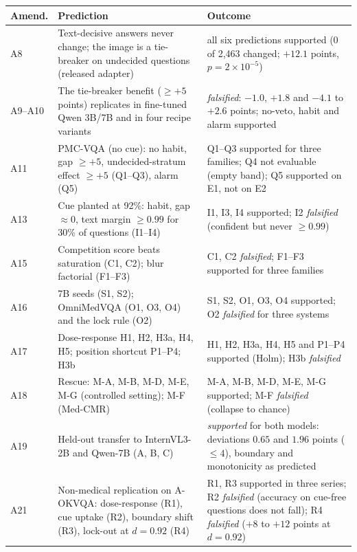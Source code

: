 \begin{table}[t]
  \centering
  \footnotesize
  \setlength{\tabcolsep}{4pt}
  \begin{tabular}{@{}l p{} p{}@{}}
    \toprule
    Amend. & Prediction & Outcome \\
    \midrule
    A8 & Text-decisive answers never change; the image is a tie-breaker on undecided questions (released adapter) & all six predictions supported (0 of 2{,}463 changed; $+12.1$ points, $p=2\times10^{-5}$) \\
    A9--A10 & The tie-breaker benefit ($\ge+5$ points) replicates in fine-tuned Qwen 3B/7B and in four recipe variants & \emph{falsified}: $-1.0$, $+1.8$ and $-4.1$ to $+2.6$ points; no-veto, habit and alarm supported \\
    A11 & PMC-VQA (no cue): no habit, gap $\ge+5$, undecided-stratum effect $\ge+5$ (Q1--Q3), alarm (Q5) & Q1--Q3 supported for three families; Q4 not evaluable (empty band); Q5 supported on E1, not on E2 \\
    A13 & Cue planted at 92\%: habit, gap $\approx0$, text margin $\ge0.99$ for 30\% of questions (I1--I4) & I1, I3, I4 supported; I2 \emph{falsified} (confident but never $\ge0.99$) \\
    A15 & Competition score beats saturation (C1, C2); blur factorial (F1--F3) & C1, C2 \emph{falsified}; F1--F3 supported for three families \\
    A16 & 7B seeds (S1, S2); OmniMedVQA (O1, O3, O4) and the lock rule (O2) & S1, S2, O1, O3, O4 supported; O2 \emph{falsified} for three systems \\
    A17 & Dose-response H1, H2, H3a, H4, H5; position shortcut P1--P4; H3b & H1, H2, H3a, H4, H5 and P1--P4 supported (Holm); H3b \emph{falsified} \\
    A18 & Rescue: M-A, M-B, M-D, M-E, M-G (controlled setting); M-F (Med-CMR) & M-A, M-B, M-D, M-E, M-G supported; M-F \emph{falsified} (collapse to chance) \\
    A19 & Held-out transfer to InternVL3-2B and Qwen-7B (A, B, C) & \emph{supported} for both models: deviations $0.65$ and $1.96$ points ($\le4$), boundary and monotonicity as predicted \\
    A21 & Non-medical replication on A-OKVQA: dose-response (R1), cue uptake (R2), boundary shift (R3), lock-out at $d=0.92$ (R4) & R1, R3 supported in three series; R2 \emph{falsified} (accuracy on cue-free questions does not fall); R4 \emph{falsified} ($+8$ to $+12$ points at $d=0.92$) \\

\end{tabular}
\end{table}
